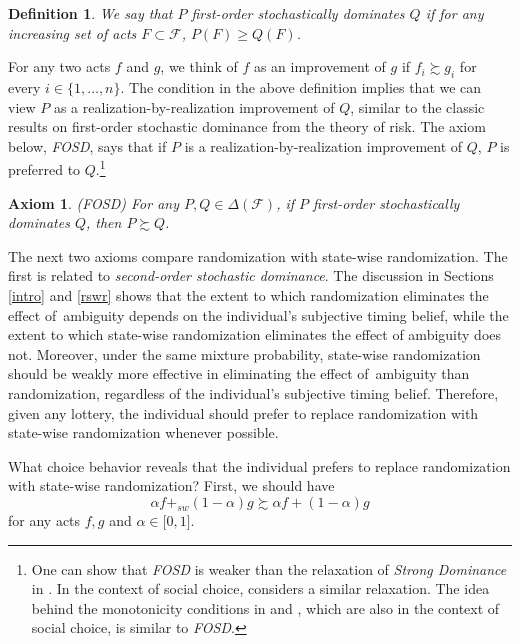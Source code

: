 \documentclass[12pt, notitlepage]{article}
\newtheorem{axiom}{Axiom}
\newtheorem{definition}{Definition}
\begin{document}
\begin{definition}
We say that $P$ \textit{first-order stochastically dominates} $Q$ if for any
increasing set of acts $F\subset \mathcal{F}$, $P(F)\geq Q(F)$.
\end{definition}

For any two acts $f$ and $g$, we think of $f$ as an improvement of $g$ if $%
f_{i}\succsim g_{i}$ for every $i\in \{1,\dots ,n\}$. The condition in the
above definition implies that we can view $P$ as a
realization-by-realization improvement of $Q$, similar to the classic
results on first-order stochastic dominance from the theory of risk. The
axiom below, \textit{FOSD}, says that if $P$ is a realization-by-realization
improvement of $Q$, $P$ is preferred to $Q$.\footnote{%
One can show that \textit{FOSD} is weaker than the relaxation of \textit{%
Strong Dominance} in \cite{Saito11}. In the context of social choice, \cite%
{Saito13} considers a similar relaxation. The idea behind the monotonicity
conditions in \cite{GajdosMaurin04} and \cite{Fleurbaey10}, which are also
in the context of social choice, is similar to \textit{FOSD}.}

\begin{axiom}
(FOSD) For any $P,Q\in \Delta (\mathcal{F})$, if $P$ first-order
stochastically dominates $Q$, then $P\succsim Q$.
\end{axiom}

The next two axioms compare randomization with state-wise randomization. The
first is related to \textit{second-order stochastic dominance}. The
discussion in Sections \ref{intro} and \ref{rswr} shows that the extent to
which randomization eliminates the effect of\ ambiguity depends on the
individual's subjective timing belief, while the extent to which state-wise
randomization eliminates the effect of ambiguity does not. Moreover, under
the same mixture probability, state-wise randomization should be weakly more
effective in eliminating the effect of\ ambiguity than randomization,
regardless of the individual's subjective timing belief. Therefore, given
any lottery, the individual should prefer to replace randomization with
state-wise randomization whenever possible.

What choice behavior reveals that the individual prefers to replace
randomization with state-wise randomization? First, we should have%
\begin{equation}
\alpha f+_{sw}(1-\alpha )g\succsim \alpha f+(1-\alpha )g  \label{swr_r}
\end{equation}%
for any acts $f,g$ and $\alpha \in \lbrack 0,1]$.
\end{document}
